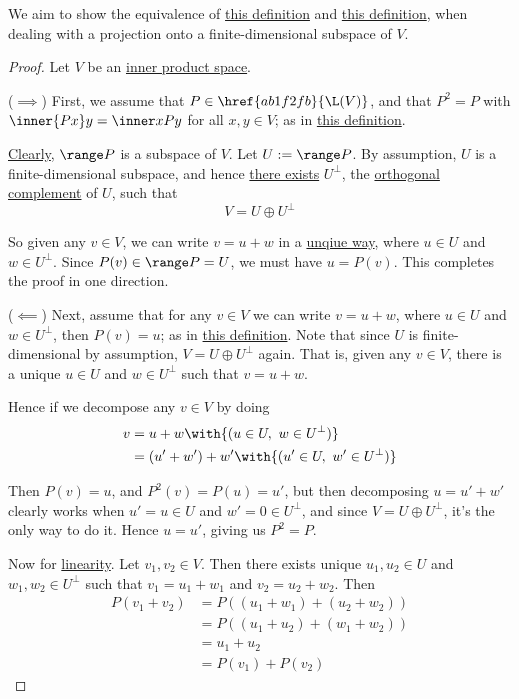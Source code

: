 \label{f18d94f}

We aim to show the equivalence of \href{fb705a2}{this definition} and
\href{dbfa2fa}{this definition}, when dealing with a projection onto a
finite-dimensional subspace of $V$.

\begin{proof}
  Let $V$ be an \href{b9935c8}{inner product space}.

  ($\implies$) First, we assume that $P\in\href{ab1f2fb}{\L(V)}$, and that
  $P^2=P$ with $\inner{Px}y=\inner x{Py}$ for all $x,y\in V$; as in
  \href{fb705a2}{this definition}.

  \href{d0afc28}{Clearly}, $\range P$ is a subspace of $V$. Let $U:=\range P$.
  By assumption, $U$ is a finite-dimensional subspace, and hence
  \href{d7635df}{there exists} $U^\perp$, the \href{c3c519f}{orthogonal
  complement} of $U$, such that
  $$
    V=U\oplus U^\perp
  $$

  So given any $v\in V$, we can write $v=u+w$ in a \href{c67c961}{unqiue way},
  where $u\in U$ and $w\in U^\perp$. Since $P(v)\in\range P=U$, we must have
  $u=P(v)$. This completes the proof in one direction.

  ($\impliedby$) Next, assume that for any $v\in V$ we can write $v=u+w$, where
  $u\in U$ and $w\in U^\perp$, then $P(v)=u$; as in \href{dbfa2fa}{this
  definition}. Note that since $U$ is finite-dimensional by assumption,
  $V=U\oplus U^\perp$ again. That is, given any $v\in V$, there is a unique
  $u\in U$ and $w\in U^\perp$ such that $v=u+w$.

  Hence if we decompose any $v\in V$ by doing
  \begin{align*}
    v &=u+w\with{(u\in U,\ w\in U^\perp)}          \\
      &=(u'+w')+w'\with{(u'\in U,\ w'\in U^\perp)}
  \end{align*}

  Then $P(v)=u$, and $P^2(v)=P(u)=u'$, but then decomposing $u=u'+w'$ clearly
  works when $u'=u\in U$ and $w'=0\in U^\perp$, and since $V=U\oplus U^\perp$,
  it's the only way to do it. Hence $u=u'$, giving us $P^2=P$.

  Now for \href{d7d1925}{linearity}. Let $v_1,v_2\in V$. Then there exists
  unique $u_1,u_2\in U$ and $w_1,w_2\in U^\perp$ such that $v_1=u_1+w_1$ and
  $v_2=u_2+w_2$. Then
  \begin{align*}
    P(v_1+v_2) &=P((u_1+w_1)+(u_2+w_2)) \\
               &=P((u_1+u_2)+(w_1+w_2)) \\
               &=u_1+u_2                \\
               &=P(v_1)+P(v_2)
  \end{align*}


\end{proof}
